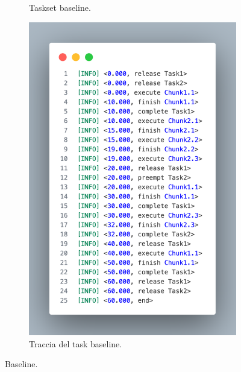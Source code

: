 \begin{figure}[htbp]
    \centering
    \begin{subfigure}{0.45\textwidth}
        \vfill
        \centering
        \caption{Taskset baseline.}
        \label{fig:baseline}
        \vfill
    \end{subfigure}
    \hfill
    \begin{subfigure}{0.45\textwidth}
        \vfill
        \centering
        \includegraphics[width=.9\textwidth]{immagini/trace baseline.pdf}
        \caption{Traccia del task baseline.}
        \label{fig:traceBaseline}
        \vfill
    \end{subfigure}
    \caption{Baseline.}
\end{figure}
